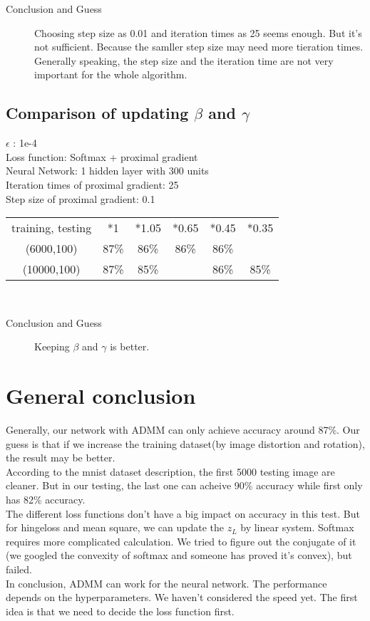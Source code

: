 \documentclass{article}
\begin{document}
\begin{description}
\item[Conclusion and Guess] Choosing step size as 0.01 and iteration times as 25 seems enough. But it's not sufficient. Because the samller step size may need more tieration times. Generally speaking, the step size and the iteration time are not very important for the whole algorithm.
\end{description}

\subsection{Comparison of updating $\beta$ and $\gamma$}
\begin{center}
$\epsilon$ : 1e-4\\
Loss function: Softmax + proximal gradient\\
Neural Network: 1 hidden layer with 300 units\\
Iteration times of proximal gradient: 25 \\
Step size of proximal gradient: 0.1 \\
	\begin{tabular}{c c c c c c}
	\hline
		{training, testing} & *1 & *1.05 & *0.65 & *0.45 & *0.35 \\
		(6000,100) & 87\% & 86\% & 86\% & 86\% & \\
		(10000,100) & 87\% & 85\% & & 86\%& 85\%\\
	\hline
	\end{tabular}\\	
\end{center}

\begin{description}
\item[Conclusion and Guess] Keeping $\beta$ and $\gamma$ is better.
\end{description}

\section{General conclusion}
Generally, our network with ADMM can only achieve accuracy around 87\%. Our guess is that if we increase the training dataset(by image distortion and rotation), the result may be better. \\
According to the mnist dataset description, the first 5000 testing image are cleaner. But in our testing, the last one can acheive 90\% accuracy while first only has 82\% accuracy. \\
The different loss functions don't have a big impact on accuracy in this test. But for hingeloss and mean square, we can update the $z_L$ by linear system. Softmax requires more complicated calculation. We tried to figure out the conjugate of it (we googled the convexity of softmax and someone has proved it's convex), but failed. \\

In conclusion, ADMM can work for the neural network. The performance depends on the hyperparameters. We haven't considered the speed yet. The first idea is that we need to decide the loss function first. 
\end{document}
